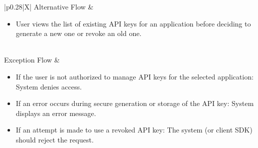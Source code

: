 \begin{minipage}{\textwidth}
\begin{tabularx}{\textwidth}{|p{0.28\textwidth}|X|}
    \hline
    Alternative Flow &
        \parbox[t]{\linewidth}{%
        \begin{itemize}
            \item User views the list of existing API keys for an application before deciding to generate a new one or revoke an old one.
        \end{itemize}%
        } \\
    \hline
    Exception Flow &
        \parbox[t]{\linewidth}{%
        \begin{itemize}
            \item If the user is not authorized to manage API keys for the selected application: System denies access.
            \item If an error occurs during secure generation or storage of the API key: System displays an error message.
            \item If an attempt is made to use a revoked API key: The system (or client SDK) should reject the request.
        \end{itemize}%
        } \\
    \hline
\end{tabularx}
\end{minipage}
\bigskip

